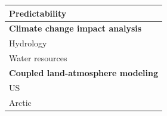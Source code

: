 \documentclass[gmd, manuscript]{copernicus}
\begin{document}
\begin{landscape}
\begin{table}[]
{\begin{tabular}{l|l|}
    \multicolumn{1}{|l|}{Predictability}          & \citet{Gebregiorgis_2011,Maurer_2003}  \\ \hline
    \multicolumn{2}{|l|}{\textbf{Climate change impact analysis}}  \\ \hline
    \multicolumn{1}{|l|}{Hydrology}               & \citet{Barnett_2005,Beyene_2010,Nijssen_2001b,Schewe_2014,Gergel_2017}  \\ \hline
    \multicolumn{1}{|l|}{Water resources}         & \citet{Christensen_2007,Das_2011,Hamlet_1999}  \\ \hline
    \multicolumn{2}{|l|}{\textbf{Coupled land-atmosphere modeling}}  \\ \hline
    \multicolumn{1}{|l|}{US}                      & \citet{Zhu_2009}  \\ \hline
    \multicolumn{1}{|l|}{Arctic}                  & \citet{Hamman_2016a} \\ \hline
  \end{tabular}
  }
\end{table}
\end{landscape}
\end{document}
